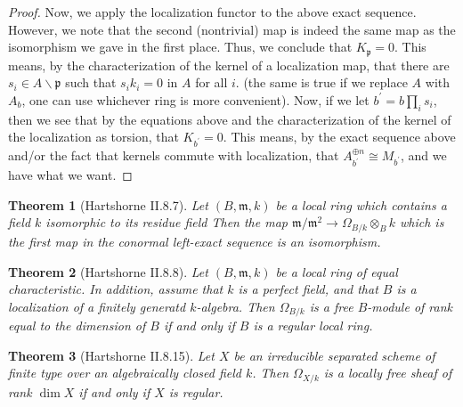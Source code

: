 \documentclass[a4paper]{article}
\newtheorem{thm}{Theorem}[section]
\newcommand{\isom}{\cong}
\begin{document}
\begin{proof}
	Now, we apply the localization functor to the above
	exact sequence. 
	However, we note that the second (nontrivial) map
	is indeed the same map as the isomorphism we
	gave in the first place.
	Thus, we conclude that \(K_{\mathfrak{p}} = 0\).
	This means, by the characterization
	of the kernel of a localization map,
	that there are \(s_{i} \in A \smallsetminus \mathfrak{p}\) 
	such that \(s_{i}k_{i} = 0\) in \(A\) for all \(i\).
	(the same is true if we replace  \(A\) with \(A_{b}\),
	one can use whichever ring is more convenient).
	Now, if we let 
	\(b^{\prime} = b \prod_{i}^{} s_{i} \),
	then we see that by the equations above
	and the characterization of the kernel of the localization
	as torsion, that
	\(K_{b^{\prime}} = 0\).
	This means, by the exact sequence above and/or the fact
	that kernels commute with localization,
	that \(A_{b^{\prime}}^{\oplus n} \isom M_{b^{\prime}}\),
	and we have what we want.
	
\end{proof}

\begin{thm}
	[Hartshorne II.8.7]
	Let \((B,\mathfrak{m},k)\) be a local ring 
	which contains a field \(k\) 
	isomorphic to its residue field
	Then the map 
	\(\mathfrak{m} / \mathfrak{m}^{2} \to \Omega_{B / k} \otimes_{B} k\)
	which is the first map in the 
	conormal left-exact sequence
	is an isomorphism.
\end{thm}


\begin{thm}
	[Hartshorne II.8.8]
	Let \((B,\mathfrak{m},k)\) be a local ring of
	equal characteristic.
	In addition, assume that
	\(k\) is a perfect field,
	and that \(B\) is a localization of
	a finitely generatd \(k\)-algebra.
	Then \(\Omega_{B / k}\) is a free \(B\)-module
	of rank equal to the dimension of \(B\) 
	if and only if \(B\) is a regular local ring.

\end{thm}


\begin{thm}
	[Hartshorne II.8.15]
	Let \(X\) be an irreducible separated scheme of finite type 
	over an algebraically closed field \(k\).
	Then \(\Omega_{X / k}\) is a locally free
	sheaf of rank \(\dim X\) if and only if 
	\(X\) is regular.
\end{thm}
\end{document}
